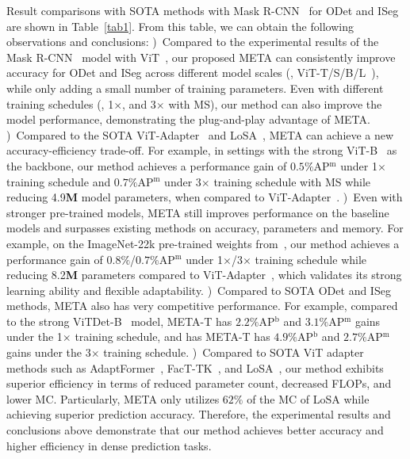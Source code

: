  Result comparisons with SOTA methods with Mask R-CNN~\citep{he2017mask} for ODet and ISeg are shown in Table~\ref{tab1}. From this table, we can obtain the following observations and conclusions: 
%
\emph{\textbf{}})~Compared to the experimental results of the Mask R-CNN~\citep{he2017mask} model with ViT~\citep{li2021benchmarking}, our proposed META can consistently improve accuracy for ODet and ISeg across different model scales (\eg, ViT-T/S/B/L~\citep{li2021benchmarking}), while only adding a small number of training parameters. Even with different training schedules (\ie, 1$\times$, and 3$\times$ with MS), our method can also improve the model performance, demonstrating the plug-and-play advantage of META. 
%
\emph{\textbf{}})~Compared to the SOTA ViT-Adapter~\citep{chen2022vision} and LoSA~\citep{mercea2024time}, META can achieve a new accuracy-efficiency trade-off. For example, in settings with the strong ViT-B~\citep{li2021benchmarking} as the backbone, our method achieves a performance gain of $0.5\%$AP$^\textrm{m}$ under 1$\times$ training schedule and $0.7\%$AP$^\textrm{m}$ under 3$\times$ training schedule with MS while reducing 4.9\textbf{M} model parameters, when compared to ViT-Adapter~\citep{chen2022vision}. 
%
\emph{\textbf{}})~Even with stronger pre-trained models, META still improves performance on the baseline models and surpasses existing methods on accuracy, parameters and memory. For example, on the ImageNet-22k pre-trained weights from~\citep{steiner2021train}, our method achieves a performance gain of $0.8\%$/$0.7\%$AP$^\textrm{m}$ under 1$\times$/3$\times$ training schedule while reducing 8.2\textbf{M} parameters compared to ViT-Adapter~\citep{chen2022vision}, which validates its strong learning ability and flexible adaptability.
%
\emph{\textbf{}})~Compared to SOTA ODet and ISeg methods, META also has very competitive performance. For example, compared to the strong ViTDet-B~\citep{li2022exploring} model, META-T has $2.2\%$AP$^\textrm{b}$ and $3.1\%$AP$^\textrm{m}$ gains under the 1$\times$ training schedule, and has META-T has $4.9\%$AP$^\textrm{b}$ and $2.7\%$AP$^\textrm{m}$ gains under the 3$\times$ training schedule.
%
\emph{\textbf{}})~Compared to SOTA ViT adapter methods such as AdaptFormer~\citep{chen2022adaptformer}, FacT-TK~\citep{jie2023fact}, and LoSA~\citep{mercea2024time}, our method exhibits superior efficiency in terms of reduced parameter count, decreased FLOPs, and lower MC. Particularly, META only utilizes $62\%$ of the MC of LoSA while achieving superior prediction accuracy. Therefore, the experimental results and conclusions above demonstrate that our method achieves better accuracy and higher efficiency in dense prediction tasks.



